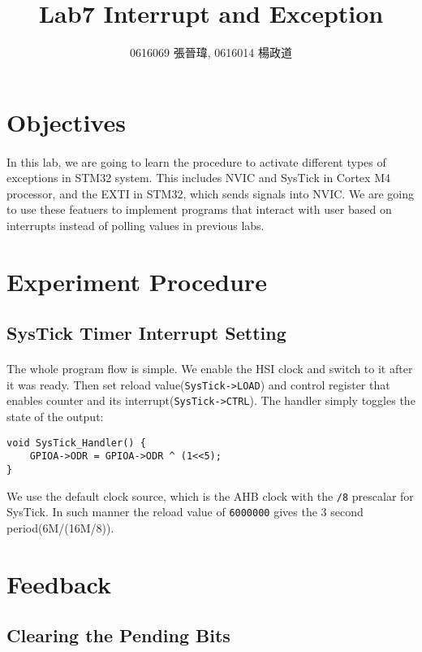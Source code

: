 \title{Lab7 Interrupt and Exception}
\author{0616069 張晉瑋, 0616014 楊政道}
\maketitle
\thispagestyle{fancy}
\section{Objectives}
\paragraph{}
In this lab, we are going to learn the procedure to activate different types of exceptions in STM32 system.
This includes NVIC and SysTick in Cortex M4 processor, and the EXTI in STM32, which sends signals into NVIC.
We are going to use these featuers to implement programs that interact with user based on interrupts instead of polling values in previous labs.
\section{Experiment Procedure}
\subsection{SysTick Timer Interrupt Setting}
\paragraph{}
The whole program flow is simple. We enable the HSI clock and switch to it after it was ready.
Then set reload value(\texttt{SysTick->LOAD}) and control register that enables counter and its interrupt(\texttt{SysTick->CTRL}).
The handler simply toggles the state of the output:
\begin{lstlisting}
void SysTick_Handler() {
	GPIOA->ODR = GPIOA->ODR ^ (1<<5);
}
\end{lstlisting}
We use the default clock source, which is the AHB clock with the \texttt{/8} prescalar for SysTick.
In such manner the reload value of \texttt{6000000} gives the 3 second period(6M/(16M/8)).

\section{Feedback}
\subsection{Clearing the Pending Bits}
